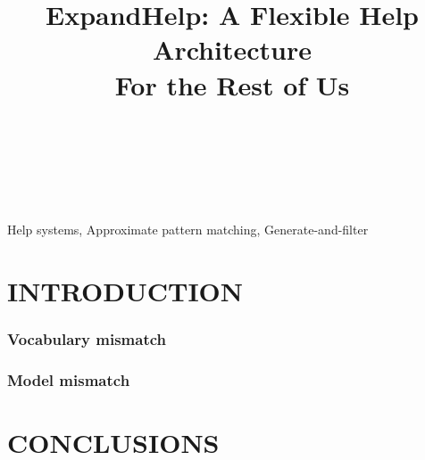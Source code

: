 \documentclass{article}
\begin{document}
\title{ExpandHelp: A Flexible Help Architecture \\For the Rest of Us}
\author{
\begin{tabular}{l}
\parbox{5.5cm}{
\begin{center}
~ \\
~ \\
~
\end{center}
}
\end{tabular}
}
\maketitle
\abstract

\keywords Help systems, Approximate pattern matching, Generate-and-filter


\section*{INTRODUCTION}

\subsubsection*{Vocabulary mismatch}

\subsubsection*{Model mismatch}


\section*{CONCLUSIONS}




\end{document}
